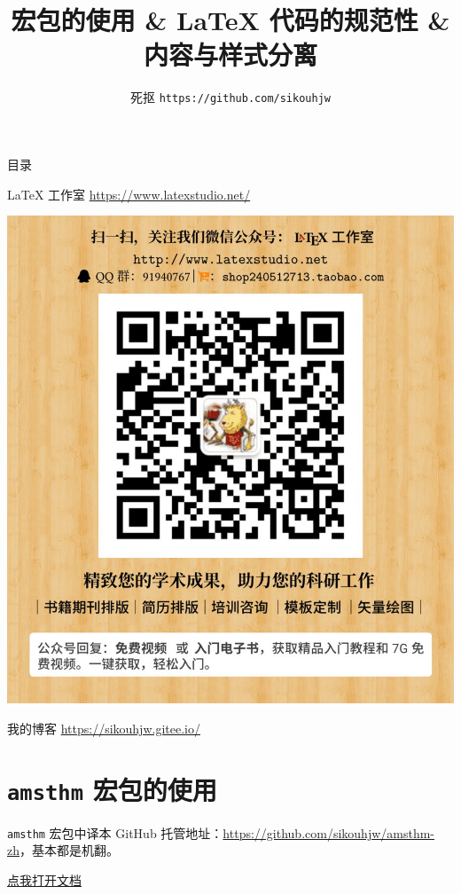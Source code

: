 \documentclass[aspectratio=169,fontset=none]{ctexbeamer}
\title{\pkg{amsthm} 宏包的使用 \& \LaTeX{} 代码的规范性 \& 内容与样式分离}
\author{死抠 \texttt{https://github.com/sikouhjw}}
\newcommand{\pkg}[1]{\texttt{#1}}
\begin{document}
  \maketitle
  \begin{frame}{目录}
    \tableofcontents
  \end{frame}
  \begin{frame}[standout]{\LaTeX{} 工作室}
    \url{https://www.latexstudio.net/}
    
    \includegraphics[height=0.7\textheight]{material/latex工作室.jpg}
  \end{frame}
  \begin{frame}[standout]{我的博客}
    \url{https://sikouhjw.gitee.io/}
  \end{frame}
  \section{\texorpdfstring{\pkg{amsthm}}{amsthm} 宏包的使用}
  \begin{frame}{\pkg{amsthm} 宏包中译本}
    GitHub 托管地址：\url{https://github.com/sikouhjw/amsthm-zh}，基本都是机翻。
    \begin{center}
      \href{material/amsthdoc-zh-v1.0.pdf}{点我打开文档}
    \end{center}
  \end{frame}
\end{document}
